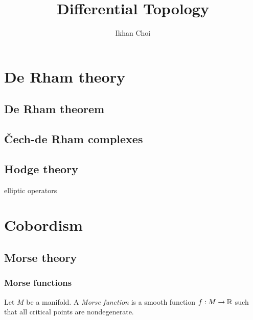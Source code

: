 \documentclass{../note}
\begin{document}
\title{Differential Topology}
\author{Ikhan Choi}
\maketitle
\tableofcontents



\part{De Rham theory}
\chapter{De Rham theorem}
\chapter{\v Cech-de Rham complexes}
\chapter{Hodge theory}
elliptic operators


\part{Cobordism}
\chapter{Morse theory}
\section{Morse functions}

\begin{defn}
Let $M$ be a manifold.
A \emph{Morse function} is a smooth function $f:M\to\mathbb{R}$ such that all critical points are nondegenerate.
\end{defn}
\end{document}
